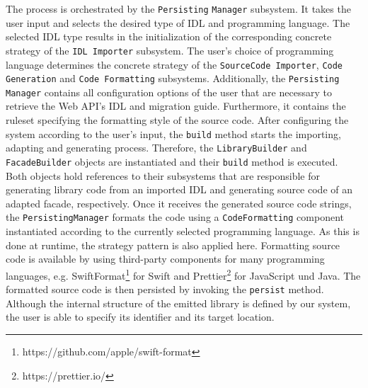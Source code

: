 The process is orchestrated by the \texttt{Persisting} \texttt{Manager} subsystem. It takes the user input and selects the desired type of \ac{IDL} and programming language. The selected IDL type results in the initialization of the corresponding concrete strategy of the \texttt{IDL Importer} subsystem. The user's choice of programming language determines the concrete strategy of the \texttt{SourceCode Importer}, \texttt{Code Generation} and \texttt{Code Formatting} subsystems. Additionally, the \texttt{Persisting} \texttt{Manager} contains all configuration options of the user that are necessary to retrieve the Web API's \ac{IDL} and migration guide. Furthermore, it contains the ruleset specifying the formatting style of the source code. After configuring the system according to the user's input, the \texttt{build} method starts the importing, adapting and generating process. Therefore, the \texttt{LibraryBuilder} and \texttt{FacadeBuilder} objects are instantiated and their \texttt{build} method is executed. Both objects hold references to their subsystems that are responsible for generating library code from an imported \ac{IDL} and generating source code of an adapted facade, respectively. Once it receives the generated source code strings, the \texttt{PersistingManager} formats the code using a \texttt{Code\-For\-mat\-ting} component instantiated according to the currently selected programming language. As this is done at runtime, the strategy pattern is also applied here. Formatting source code is available by using third-party components for many programming languages, e.g. SwiftFormat\footnote{https://github.com/apple/swift-format} for Swift and Prettier\footnote{https://prettier.io/} for JavaScript und Java. The formatted source code is then persisted by invoking the \texttt{persist} method. Although the internal structure of the emitted library is defined by our system, the user is able to specify its identifier and its target location.